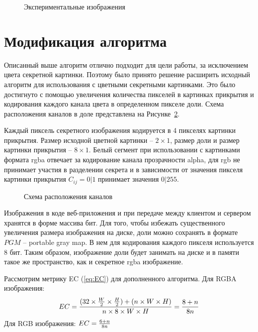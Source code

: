 \documentclass[a4paper,article,14pt]{extarticle}
\begin{document}
\begin{figure}[H]
\begin{minipage}[h]{0.3\linewidth}
    \end{minipage}
    \caption{Экспериментальные изображения}
    \label{fig:experimental_grey_images}
\end{figure}

\section{Модификация алгоритма}

Описанный выше алгоритм отлично подходит для цели работы, за исключением цвета секретной картинки. Поэтому
было принято решение расширить исходный алгоритм для использования с цветными секретными картинками. 
Это было достигнуто с помощью увеличения количества пикселей в картинках прикрытия и кодирования каждого канала цвета 
в определенном пикселе доли. Схема расположения каналов в доле представлена на Рисунке~\ref{fig:channels}. 

Каждый пиксель секретного изображения кодируется в 4 пикселях картинки прикрытия.
Размер исходной цветной картинки -- $2\times 1$, размер доли и размер картинки прикрытия -- $8 \times 1$.
Белый сегмент при использовании с картинками формата rgba отвечает за кодирование канала прозрачности alpha,
для rgb не принимает участия в разделении секрета и в зависимости от значения пикселя картинки прикрытия $C_{ij} = 0 | 1$ принимает значения $0 | 255$.

\begin{figure}[H]
    \caption{Схема расположения каналов}
    \label{fig:channels}
\end{figure}

Изображения в коде веб-приложения и при передаче между клиентом и сервером хранятся в форме массива бит. 
Для того, чтобы избежать существенного увеличения размера изображения на диске, доли можно сохранять в формате $PGM$ -- portable gray map. В нем для 
кодирования каждого пикселя используется 8 бит. Таким образом, изображение доли будет занимать на диске и в памяти такое же пространство, как и секретное rgba изображение.

Рассмотрим метрику EC (\ref{eq:EC}) для дополненного алгоритма. Для RGBA изображения: 
$$EC = {{(32 \times {W \over 2} \times {H \over 2}) + (n \times W \times H)} \over
{n \times 8 \times W \times H}} = {8+n \over 8n}$$
Для RGB изображения:
$EC = {6+n \over 8n}$
\end{document}
